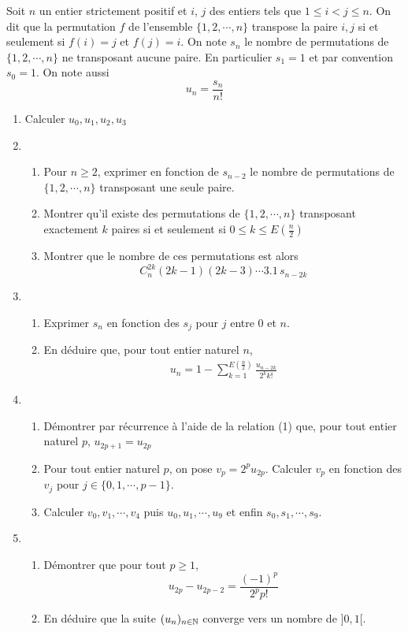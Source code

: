 Soit $n$ un entier strictement positif et $i$, $j$ des entiers tels que $1\leq i<j \leq n$. On dit que la permutation $f$ de l'ensemble $\{1,2,\cdots,n\}$ transpose la paire ${i,j}$ si et seulement si $f(i)=j$ et $f(j)=i$.\newline
On note $s_{n}$ le nombre de permutations de $\{1,2,\cdots,n\}$ ne transposant aucune paire. En particulier $s_{1}=1$ et par convention $s_{0}=1$. On note aussi
\[u_{n}=\frac{s_{n}}{n !}\]
\begin{enumerate}
\item Calculer $u_{0}, u_{1}, u_{2}, u_{3}$ 
\item \begin{enumerate}
\item Pour $n\geq 2$, exprimer en fonction de $s_{n-2}$ le nombre de permutations de $\{1,2,\cdots,n\}$ transposant une seule paire.
\item Montrer qu'il existe des permutations de $\{1,2,\cdots,n\}$ transposant exactement $k$ paires si et seulement si $0 \leq k \leq E(\frac{n}{2})$
\item Montrer que le nombre de ces permutations est alors 
\[C_{n}^{2k}(2k-1)(2k-3)\cdots 3 . 1 \,s_{n-2k}\]
\end{enumerate}
\item \begin{enumerate}
\item Exprimer $s_{n}$ en fonction des $s_{j}$ pour $j$ entre 0 et $n$.
\item En déduire que, pour tout entier naturel $n$,
\begin{eqnarray}
u_{n}=1-\sum _{k=1}^{E(\frac{n}{2})}\frac{u_{n-2k}}{2^{k}k !}
\end{eqnarray}
\end{enumerate}
\item \begin{enumerate}
\item Démontrer par récurrence à l'aide de la relation (1) que, pour tout entier naturel $p$, $u_{2p+1}=u_{2p}$
\item Pour tout entier naturel $p$, on pose $v_{p}=2^{p}u_{2p}$. Calculer $v_{p}$ en fonction des $v_{j}$ pour $j\in \{0,1,\cdots,p-1\}$.
\item Calculer $v_{0},v_{1},\cdots,v_{4}$ puis $u_{0},u_{1},\cdots,u_{9}$ et enfin $s_{0},s_{1},\cdots,s_{9}$.
\end{enumerate}
\item \begin{enumerate}
\item Démontrer que pour tout $p\geq 1$,
\[u_{2p}-u_{2p-2}=\frac{(-1)^{p}}{2^{p}p !}\]
\item En déduire que la suite $(u_n)_{n\in \mathbb{N}}$ converge vers un nombre de $]0,1[$.
\end{enumerate}
\end{enumerate}

